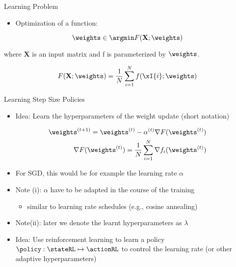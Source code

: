 	
\begin{frame}[c]{Learning Problem }


\begin{itemize}
	\item Optimization of a function:
\end{itemize}
\begin{equation}
	\weights \in \argmin F(\mathbf{X}; \weights) \nonumber
\end{equation}

where $\mathbf{X}$ is an input matrix and f is parameterized by $\weights$.


\pause
\medskip

\begin{equation}
F(\mathbf{X}; \weights) = \frac{1}{N} \sum_{i=1}^N f(\xI{i}; \weights) \nonumber
\end{equation}




\end{frame}
\begin{frame}[c]{Learning Step Size Policies }

\begin{itemize}
\item \alert{Idea:} Learn the hyperparameters of the weight update (short notation)
\end{itemize} 

\begin{eqnarray}
\weights^{(t+1)} = \weights^{(t)} - \alpha^{(t)} \nabla F(\weights^{(t)}) \nonumber\\
\nabla F(\weights^{(t)}) = \frac{1}{N} \sum_{i=1}^N \nabla f_i(\weights^{(t)})\nonumber
\end{eqnarray}


\begin{itemize}
\pause
\item For SGD, this would be for example the learning rate $\alpha$
\pause
\item \alert{Note (i)}: $\alpha$ have to be adapted in the course of the training
\begin{itemize}
\item similar to learning rate schedules (e.g., cosine annealing)
\end{itemize}
\pause
\item \alert{Note(ii)}: later we denote the learnt hyperparameters as $\lambda$
\medskip
\pause
\item \alert{Idea:} Use reinforcement learning to learn a policy $\policy: \stateRL \mapsto \actionRL$ to control the learning rate (or other adaptive hyperparameters)
\end{itemize}



\end{frame}

